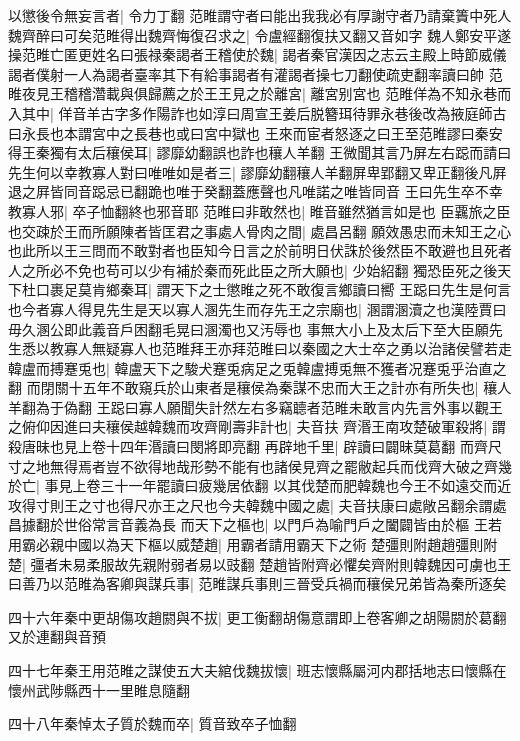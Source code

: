 以懲後令無妄言者|{
	令力丁翻}
范睢謂守者曰能出我我必有厚謝守者乃請棄簀中死人魏齊醉曰可矣范睢得出魏齊悔復召求之|{
	令盧經翻復扶又翻又音如字}
魏人鄭安平遂操范睢亡匿更姓名曰張禄秦謁者王稽使於魏|{
	謁者秦官漢因之志云主殿上時節威儀謁者僕射一人為謁者臺率其下有給事謁者有灌謁者操七刀翻使疏吏翻率讀曰帥}
范睢夜見王稽稽濳載與俱歸薦之於王王見之於離宮|{
	離宮别宮也}
范睢佯為不知永巷而入其中|{
	佯音羊古字多作陽詐也如淳曰周宣王姜后脱簪珥待罪永巷後改為掖庭師古曰永長也本謂宮中之長巷也或曰宮中獄也}
王來而宦者怒逐之曰王至范睢謬曰秦安得王秦獨有太后穰侯耳|{
	謬靡幼翻誤也詐也穰人羊翻}
王微聞其言乃屏左右跽而請曰先生何以幸教寡人對曰唯唯如是者三|{
	謬靡幼翻穰人羊翻屏卑郢翻又卑正翻後凡屛退之屛皆同音跽忌已翻跪也唯于癸翻蓋應聲也凡唯諾之唯皆同音}
王曰先生卒不幸教寡人邪|{
	卒子恤翻終也邪音耶}
范睢曰非敢然也|{
	睢音雖然猶言如是也}
臣覊旅之臣也交疎於王而所願陳者皆匡君之事處人骨肉之間|{
	處昌呂翻}
願效愚忠而未知王之心也此所以王三問而不敢對者也臣知今日言之於前明日伏誅於後然臣不敢避也且死者人之所必不免也苟可以少有補於秦而死此臣之所大願也|{
	少始紹翻}
獨恐臣死之後天下杜口裹足莫肯鄉秦耳|{
	謂天下之士懲睢之死不敢復言鄉讀曰嚮}
王跽曰先生是何言也今者寡人得見先生是天以寡人溷先生而存先王之宗廟也|{
	溷謂溷瀆之也漢陸賈曰毋久溷公即此義音戶困翻毛晃曰溷濁也又汚辱也}
事無大小上及太后下至大臣願先生悉以教寡人無疑寡人也范睢拜王亦拜范睢曰以秦國之大士卒之勇以治諸侯譬若走韓盧而搏蹇兎也|{
	韓盧天下之駿犬蹇兎病足之兎韓盧搏兎無不獲者况蹇兎乎治直之翻}
而閉關十五年不敢窺兵於山東者是穰侯為秦謀不忠而大王之計亦有所失也|{
	穰人羊翻為于偽翻}
王跽曰寡人願聞失計然左右多竊聼者范睢未敢言内先言外事以觀王之俯仰因進曰夫穰侯越韓魏而攻齊剛壽非計也|{
	夫音扶}
齊湣王南攻楚破軍殺將|{
	謂殺唐昧也見上卷十四年湣讀曰閔將即亮翻}
再辟地千里|{
	辟讀曰闢昧莫葛翻}
而齊尺寸之地無得焉者豈不欲得地哉形勢不能有也諸侯見齊之罷敝起兵而伐齊大破之齊幾於亡|{
	事見上卷三十一年罷讀曰疲幾居依翻}
以其伐楚而肥韓魏也今王不如遠交而近攻得寸則王之寸也得尺亦王之尺也今夫韓魏中國之處|{
	夫音扶康曰處敞呂翻余謂處昌據翻於世俗常言音義為長}
而天下之樞也|{
	以門戶為喻門戶之闔闢皆由於樞}
王若用霸必親中國以為天下樞以威楚趙|{
	用霸者請用霸天下之術}
楚彊則附趙趙彊則附楚|{
	彊者未易柔服故先親附弱者易以豉翻}
楚趙皆附齊必懼矣齊附則韓魏因可虜也王曰善乃以范睢為客卿與謀兵事|{
	范睢謀兵事則三晉受兵禍而穰侯兄弟皆為秦所逐矣}


四十六年秦中更胡傷攻趙閼與不拔|{
	更工衡翻胡傷意謂即上卷客卿之胡陽閼於葛翻又於連翻與音預}


四十七年秦王用范睢之謀使五大夫綰伐魏拔懷|{
	班志懷縣屬河内郡括地志曰懷縣在懷州武陟縣西十一里睢息隨翻}


四十八年秦悼太子質於魏而卒|{
	質音致卒子恤翻}


